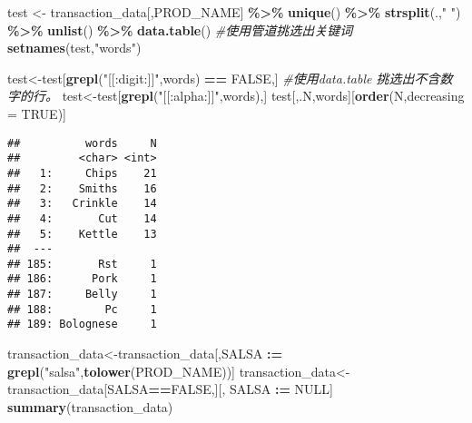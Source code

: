\documentclass[
]{article}
\newenvironment{Shaded}{\begin{snugshade}}{\end{snugshade}}
\newcommand{\AttributeTok}[1]{\textcolor[rgb]{0.13,0.29,0.53}{#1}}
\newcommand{\CommentTok}[1]{\textcolor[rgb]{0.56,0.35,0.01}{\textit{#1}}}
\newcommand{\ConstantTok}[1]{\textcolor[rgb]{0.56,0.35,0.01}{#1}}
\newcommand{\FunctionTok}[1]{\textcolor[rgb]{0.13,0.29,0.53}{\textbf{#1}}}
\newcommand{\NormalTok}[1]{#1}
\newcommand{\OtherTok}[1]{\textcolor[rgb]{0.56,0.35,0.01}{#1}}
\newcommand{\SpecialCharTok}[1]{\textcolor[rgb]{0.81,0.36,0.00}{\textbf{#1}}}
\newcommand{\StringTok}[1]{\textcolor[rgb]{0.31,0.60,0.02}{#1}}
\begin{document}
\begin{Shaded}
\begin{Highlighting}[]
\NormalTok{test }\OtherTok{\textless{}{-}}\NormalTok{ transaction\_data[,PROD\_NAME] }\SpecialCharTok{\%\textgreater{}\%} \FunctionTok{unique}\NormalTok{() }\SpecialCharTok{\%\textgreater{}\%} \FunctionTok{strsplit}\NormalTok{(.,}\StringTok{" "}\NormalTok{) }\SpecialCharTok{\%\textgreater{}\%} \FunctionTok{unlist}\NormalTok{() }\SpecialCharTok{\%\textgreater{}\%} \FunctionTok{data.table}\NormalTok{()  }\CommentTok{\#使用管道挑选出关键词}
\FunctionTok{setnames}\NormalTok{(test,}\StringTok{"words"}\NormalTok{)}

\NormalTok{test}\OtherTok{\textless{}{-}}\NormalTok{test[}\FunctionTok{grepl}\NormalTok{(}\StringTok{"[[:digit:]]"}\NormalTok{,words) }\SpecialCharTok{==} \ConstantTok{FALSE}\NormalTok{,]  }\CommentTok{\#使用data.table 挑选出不含数字的行。}
\NormalTok{test}\OtherTok{\textless{}{-}}\NormalTok{test[}\FunctionTok{grepl}\NormalTok{(}\StringTok{"[[:alpha:]]"}\NormalTok{,words),]}
\NormalTok{test[,.N,words][}\FunctionTok{order}\NormalTok{(N,}\AttributeTok{decreasing =} \ConstantTok{TRUE}\NormalTok{)]}
\end{Highlighting}
\end{Shaded}

\begin{verbatim}
##          words     N
##         <char> <int>
##   1:     Chips    21
##   2:    Smiths    16
##   3:   Crinkle    14
##   4:       Cut    14
##   5:    Kettle    13
##  ---                
## 185:       Rst     1
## 186:      Pork     1
## 187:     Belly     1
## 188:        Pc     1
## 189: Bolognese     1
\end{verbatim}

\begin{Shaded}
\begin{Highlighting}[]
\NormalTok{transaction\_data}\OtherTok{\textless{}{-}}\NormalTok{transaction\_data[,SALSA }\SpecialCharTok{:=} \FunctionTok{grepl}\NormalTok{(}\StringTok{"salsa"}\NormalTok{,}\FunctionTok{tolower}\NormalTok{(PROD\_NAME))]}
\NormalTok{transaction\_data}\OtherTok{\textless{}{-}}\NormalTok{transaction\_data[SALSA}\SpecialCharTok{==}\ConstantTok{FALSE}\NormalTok{,][, SALSA }\SpecialCharTok{:=} \ConstantTok{NULL}\NormalTok{]}
\FunctionTok{summary}\NormalTok{(transaction\_data)}
\end{Highlighting}
\end{Shaded}
\end{document}
